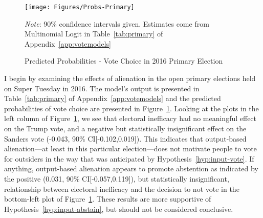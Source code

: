 \documentclass[12pt]{article}
\begin{document}
\begin{figure}[!ht]
	\centering
	\texttt{[image: Figures/Probs-Primary]}
	\caption{Predicted Probabilities - Vote Choice in 2016 Primary Election}\label{fig:primary}
	\vspace{-8pt}
	{\scriptsize \textit{Note}: 90\% confidence intervals given. Estimates come from Multinomial Logit in Table~\ref{tab:primary} of Appendix~\ref{app:votemodels} \par}
\end{figure}

I begin by examining the effects of alienation in the open primary elections held on Super Tuesday in 2016. The model's output is presented in Table~\ref{tab:primary} of Appendix~\ref{app:votemodels} and the predicted probabilities of vote choice are presented in Figure~\ref{fig:primary}. Looking at the plots in the left column of Figure~\ref{fig:primary}, we see that electoral inefficacy had no meaningful effect on the Trump vote, and a negative but statistically insignificant effect on the Sanders vote (-0.043, 90\% CI[-0.102,0.019]). This indicates that output-based alienation---at least in this particular election---does not motivate people to vote for outsiders in the way that was anticipated by Hypothesis~\ref{hyp:input-vote}. If anything, output-based alienation appears to promote abstention as indicated by the positive (0.031, 90\% CI[-0.057,0.119]), but statistically insignificant, relationship between electoral inefficacy and the decision to not vote in the bottom-left plot of Figure~\ref{fig:primary}. These results are more supportive of Hypothesis~\ref{hyp:input-abstain}, but should not be considered conclusive. 

\end{document}
